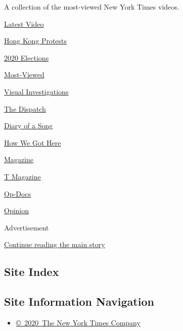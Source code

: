 A collection of the most-viewed New York Times videos.

\href{/video}{}

\href{/video/latest-video}{Latest Video}

\href{/video/hk-protest}{Hong Kong Protests}

\href{/video/2020-Elections}{2020 Elections}

\href{/video/Most-Viewed}{Most-Viewed}

\href{/video/investigations}{Visual Investigations}

\href{/video/on-the-ground}{The Dispatch}

\href{/video/diaryofasong}{Diary of a Song}

\href{/video/how-we-got-here}{How We Got Here}

\href{/video/magazine}{Magazine}

\href{/video/t-magazine}{T Magazine}

\href{/video/op-docs}{Op-Docs}

\href{/video/opinion}{Opinion}

Advertisement

\protect\hyperlink{after-bottom}{Continue reading the main story}

\hypertarget{site-index}{%
\subsection{Site Index}\label{site-index}}

\hypertarget{site-information-navigation}{%
\subsection{Site Information
Navigation}\label{site-information-navigation}}

\begin{itemize}
\tightlist
\item
  \href{https://help.nytimes.com/hc/en-us/articles/115014792127-Copyright-notice}{©~2020~The
  New York Times Company}
\end{itemize}

